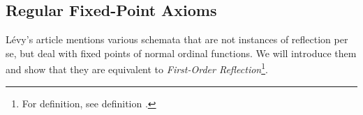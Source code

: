 \begin{comment}
In order to reach an inaccessible cardinal of size $\kappa$, one has to pass at least $\kappa$ limit ordinals. Them, to get to a Mahlo cardinal of size $\kappa$, one has to move past $\kappa$ inaccessible cardinals. This concept is then iterable for hyper-Mahlo cardinals, as we will see later in this section.





\end{comment} %

\subsection{Regular Fixed-Point Axioms}\label{sec:regular_fixed_points}
Lévy's article mentions various schemata that are not instances of reflection per se, but deal with fixed points of normal ordinal functions. We will introduce them and show that they are equivalent to \emph{First-Order Reflection}\footnote{For definition, see definition .}.

